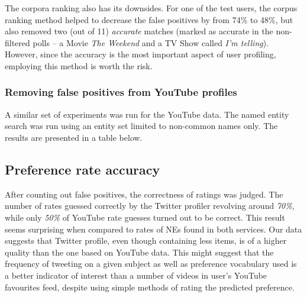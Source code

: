 The corpora ranking also has its downsides. For one of the test users, the corpus ranking method helped to
decrease the false positives by from 74\% to 48\%, but also removed two (out of 11) \textit{accurate} matches (marked as
accurate in the non-filtered polls -- a Movie \textit{The Weekend} and a TV Show called \textit{I'm telling}).
However, since the accuracy is the most important aspect of user profiling, employing this method is worth
the risk.

\subsubsection{Removing false positives from YouTube profiles}

A similar set of experiments was run for the YouTube data. The named entity
search was run using an entity set limited to non-common names only. The
results are presented in a table below.

\subsection{Preference rate accuracy}
After counting out false positives, the correctness of ratings was judged. The
number of rates guessed correctly by the Twitter profiler revolving around \textit{70\%},
while only \textit{50\%} of YouTube rate guesses turned out to be correct. This
result seems surprising when compared to rates of NEs found in both
services. Our data suggests that Twitter profile, even though containing less
items, is of a higher quality than the one based on YouTube data.  This
might suggest that the frequency of tweeting on a given subject as well as
preference vocabulary used is a better indicator of interest than a number of
videos in user's YouTube favourites feed, despite using simple methods of rating
the predicted preference.
